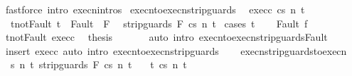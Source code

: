 \begin{isabellebody}
\ {\isacharparenleft}fastforce\ intro{\isacharcolon}\ execn{\isachardot}intros{\isacharparenright}\isanewline
{}\isamarkupfalse%
%
\endisatagproof
{\isafoldproof}%
%
\isadelimproof
\isanewline
%
\endisadelimproof
\isanewline
{}\isamarkupfalse%
\ execn{\isacharunderscore}to{\isacharunderscore}execn{\isacharunderscore}strip{\isacharunderscore}guards{\isacharprime}{\isacharcolon}\isanewline
\ \ exec{\isacharunderscore}c{\isacharcolon}\ {\isachardoublequoteopen}{\isasymGamma}{\isasymturnstile}{\isasymlangle}c{\isacharcomma}s{\isasymrangle}\ {\isacharequal}n{\isasymRightarrow}\ t{\isachardoublequoteclose}\ \isanewline
\ \ t{\isacharunderscore}not{\isacharunderscore}Fault{\isacharcolon}\ {\isachardoublequoteopen}t\ {\isasymnotin}\ Fault\ {\isacharbackquote}\ F{\isachardoublequoteclose}\isanewline
\ \ {\isachardoublequoteopen}{\isasymGamma}{\isasymturnstile}{\isasymlangle}strip{\isacharunderscore}guards\ F\ c{\isacharcomma}s{\isasymrangle}\ {\isacharequal}n{\isasymRightarrow}\ t{\isachardoublequoteclose}\isanewline
%
\isadelimproof
%
\endisadelimproof
%
\isatagproof
{}\isamarkupfalse%
\ {\isacharparenleft}cases\ t{\isacharparenright}\isanewline
\ \ \isamarkupfalse%
\ {\isacharparenleft}Fault\ f{\isacharparenright}\isanewline
\ \ \isamarkupfalse%
\ t{\isacharunderscore}not{\isacharunderscore}Fault\ exec{\isacharunderscore}c\ \isamarkupfalse%
\ {\isacharquery}thesis\ \isanewline
\ \ \ \ \isamarkupfalse%
\ {\isacharparenleft}auto\ intro{\isacharcolon}\ execn{\isacharunderscore}to{\isacharunderscore}execn{\isacharunderscore}strip{\isacharunderscore}guards{\isacharunderscore}Fault{\isacharparenright}\isanewline
{}\isamarkupfalse%
\ {\isacharparenleft}insert\ exec{\isacharunderscore}c{\isacharcomma}\ auto\ intro{\isacharcolon}\ execn{\isacharunderscore}to{\isacharunderscore}execn{\isacharunderscore}strip{\isacharunderscore}guards{\isacharparenright}%
\endisatagproof
{\isafoldproof}%
%
\isadelimproof
\isanewline
%
\endisadelimproof
\ \ \isanewline
{}\isamarkupfalse%
\ execn{\isacharunderscore}strip{\isacharunderscore}guards{\isacharunderscore}to{\isacharunderscore}execn{\isacharcolon}\isanewline
\ \ {\isachardoublequoteopen}{\isasymAnd}s\ n\ t{\isachardot}\ {\isasymGamma}{\isasymturnstile}{\isasymlangle}strip{\isacharunderscore}guards\ F\ c{\isacharcomma}s{\isasymrangle}\ {\isacharequal}n{\isasymRightarrow}\ t\isanewline
\ \ {\isasymLongrightarrow}\ {\isasymexists}t{\isacharprime}{\isachardot}\ {\isasymGamma}{\isasymturnstile}{\isasymlangle}c{\isacharcomma}s{\isasymrangle}\ {\isacharequal}n{\isasymRightarrow}\ t{\isacharprime}\ {\isasymand}\ \isanewline

\end{isabellebody}
